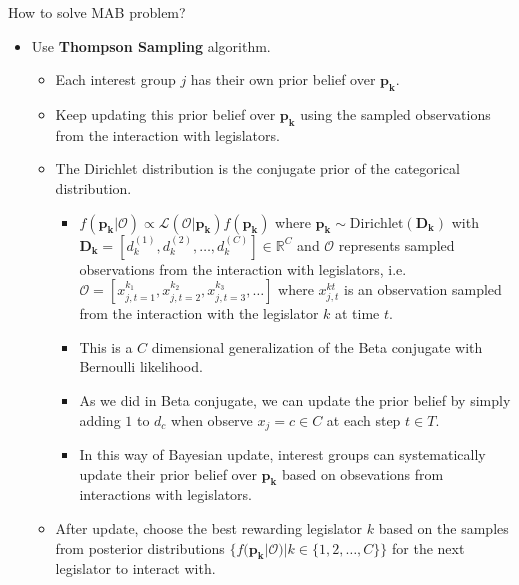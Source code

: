 \documentclass{beamer}
\begin{document}
	\begin{frame}{How to solve MAB problem?}
		\begin{itemize}
			\item Use \textbf{Thompson Sampling} algorithm.
			\begin{itemize}
				\item Each interest group $j$ has their own prior belief over $\mathbf{p_k}$.
				\item Keep updating this prior belief over $\mathbf{p_k}$ using the sampled observations from the interaction with legislators.
				\item The Dirichlet distribution is the conjugate prior of the categorical distribution.
				\begin{itemize}
					\item $f(\mathbf{p_k} | \mathcal{O}) \propto \mathcal{L(\mathcal{O | \mathbf{p_k}})} f(\mathbf{p_k})$ where $\mathbf{p_k} \sim \operatorname{Dirichlet(\mathbf{D_k})}$ with $\mathbf{D_k} = [d_k^{(1)}, d_k^{(2)}, \hdots, d_k^{(C)}] \in \mathbb{R}^C $ and $\mathcal{O}$ represents sampled observations from the interaction with legislators, i.e. $\mathcal{O} = [x_{j, t=1}^{k_1}, x_{j, t=2}^{k_2}, x_{j, t=3}^{k_3}, \hdots]$ where $x_{j, t}^{kt}$ is an observation sampled from the interaction with the legislator $k$ at time $t$. 
					\item This is a $C$ dimensional generalization of the Beta conjugate with Bernoulli likelihood.
					\item As we did in Beta conjugate, we can update the prior belief by simply adding $1$ to $d_c$ when observe $x_j = c \in C$ at each step $t \in T$.
					\item In this way of Bayesian update, interest groups can systematically update their prior belief over $\mathbf{p_k}$ based on obsevations from interactions with legislators.
				\end{itemize}
				\item After update, choose the best rewarding legislator $k$ based on the samples from posterior distributions $\{f(\mathbf{p_k} | \mathcal{O})| k \in \{1, 2, \hdots, C\}\}$ for the next legislator to interact with.
			\end{itemize}
		\end{itemize}
	\end{frame}
\end{document}
